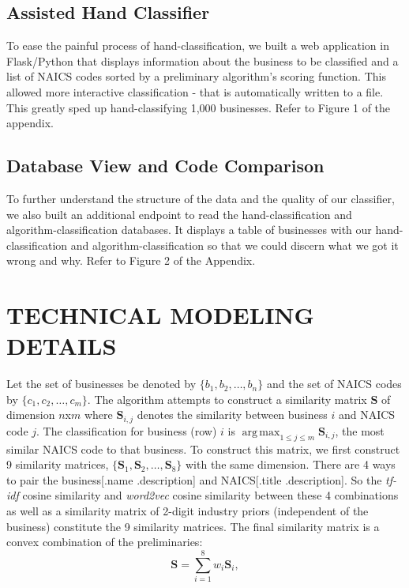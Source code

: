 \documentclass[letterpaper, 10 pt, conference]{IEEEtran}
\DeclareMathOperator*{\argmax}{arg\,max}
\newcommand{\matr}[1]{\mathbf{#1}}
\begin{document}
\subsection{Assisted Hand Classifier}

To ease the painful process of hand-classification, we built a web application in Flask/Python that displays information about the business to be classified and a list of NAICS codes sorted by a preliminary algorithm's scoring function. This allowed more interactive classification - that is automatically written to a file. This greatly sped up hand-classifying 1,000 businesses. Refer to Figure 1 of the appendix.

\subsection{Database View and Code Comparison}

To further understand the structure of the data and the quality of our classifier, we also built an additional endpoint to read the hand-classification and algorithm-classification databases. It displays a table of businesses with our hand-classification and algorithm-classification so that we could discern what we got it wrong and why. Refer to Figure 2 of the Appendix.

\section{TECHNICAL MODELING DETAILS}

Let the set of businesses be denoted by $\{b_1,b_2,\dots,b_n\}$ and the set of NAICS codes by $\{c_1,c_2,\dots,c_m\}$. The algorithm attempts to construct a similarity matrix $\matr{S}$ of dimension $n$x$m$ where $\matr{S}_{i,j}$ denotes the similarity between business $i$ and NAICS code $j$. The classification for business (row) $i$ is $\argmax_{1 \leq j \leq m} \matr{S}_{i,j}$, the most similar NAICS code to that business. To construct this matrix, we first construct 9 similarity matrices, $\{\matr{S}_1,\matr{S}_2,\dots,\matr{S}_8\}$ with the same dimension. There are 4 ways to pair the business[.name .description] and NAICS[.title .description]. So the \textit{tf-idf} cosine similarity and \textit{word2vec} cosine similarity between these 4 combinations as well as a similarity matrix of 2-digit industry priors (independent of the business) constitute the 9 similarity matrices. The final similarity matrix is a convex combination of the preliminaries: \[ \matr{S} = \sum_{i=1}^8 w_i \matr{S}_i, \]
\end{document}
